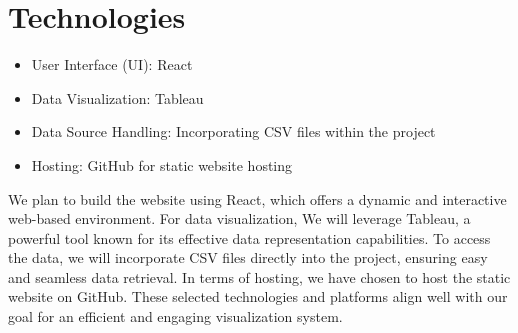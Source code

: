 \documentclass{article}
\begin{document}
\section*{Technologies}
\begin{itemize}[topsep=0pt, partopsep=0pt, itemsep=1pt, parsep=1pt, before=\vspace{0pt}]
    \item User Interface (UI): React
    \item Data Visualization: Tableau
    \item Data Source Handling: Incorporating CSV files within the project
    \item Hosting: GitHub for static website hosting
\end{itemize}

\vspace{5mm} %

We plan to build the website using React, which offers a dynamic and interactive 
web-based environment. For data visualization, We will leverage Tableau, 
a powerful tool known for its effective data representation capabilities. 
To access the data, we will incorporate CSV files directly into the project, 
ensuring easy and seamless data retrieval. 
In terms of hosting, we have chosen to host the static website on GitHub.
These selected technologies and platforms align well with our goal 
for an efficient and engaging visualization system.
\end{document}
